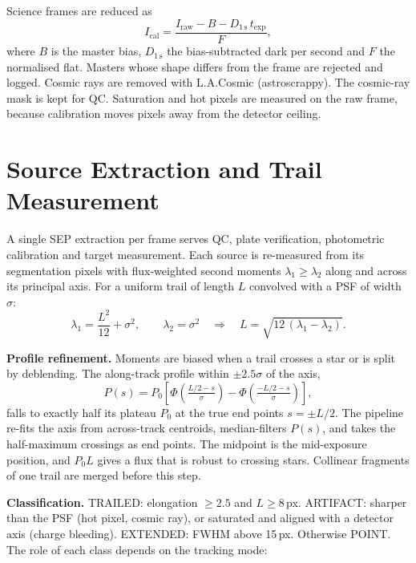 \documentclass[11pt,a4paper]{article}
\newcommand{\brkus}{\textunderscore\allowbreak}
\newcommand{\code}[1]{{\ttfamily\let\_\brkus #1}}
\begin{document}
Science frames are reduced as
\begin{equation}
I_\mathrm{cal} = \frac{I_\mathrm{raw} - B - D_{1\,\mathrm{s}}\, t_\mathrm{exp}}{F},
\end{equation}
where $B$ is the master bias, $D_{1\,\mathrm{s}}$ the bias-subtracted dark per second and $F$
the normalised flat. Masters whose shape differs from the frame are rejected and logged.
Cosmic rays are removed with L.A.Cosmic \cite{vandokkum2001} (astroscrappy). The
cosmic-ray mask is kept for QC. Saturation and hot pixels are measured on the raw frame,
because calibration moves pixels away from the detector ceiling.

\section{Source Extraction and Trail Measurement}

A single SEP \cite{bertin1996,barbary2016} extraction per frame serves QC, plate verification,
photometric calibration and target measurement. Each source is re-measured from its
segmentation pixels with flux-weighted second moments $\lambda_1 \geq \lambda_2$ along and
across its principal axis. For a uniform trail of length $L$ convolved with a PSF of width
$\sigma$:
\begin{equation}
\lambda_1 = \frac{L^2}{12} + \sigma^2,\qquad \lambda_2 = \sigma^2
\quad\Rightarrow\quad L = \sqrt{12\,(\lambda_1-\lambda_2)} .
\end{equation}

\textbf{Profile refinement.} Moments are biased when a trail crosses a star or is split by
deblending. The along-track profile within $\pm 2.5\sigma$ of the axis,
\begin{equation}
P(s) = P_0\left[\Phi\!\left(\tfrac{L/2 - s}{\sigma}\right) - \Phi\!\left(\tfrac{-L/2 - s}{\sigma}\right)\right],
\end{equation}
falls to exactly half its plateau $P_0$ at the true end points $s=\pm L/2$. The pipeline
re-fits the axis from across-track centroids, median-filters $P(s)$, and takes the
half-maximum crossings as end points. The midpoint is the mid-exposure position, and
$P_0 L$ gives a flux that is robust to crossing stars. Collinear fragments of one trail are
merged before this step.

\textbf{Classification.} \code{TRAILED}: elongation $\geq 2.5$ and $L\geq 8$\,px.
\code{ARTIFACT}: sharper than the PSF (hot pixel, cosmic ray), or saturated and aligned with a
detector axis (charge bleeding). \code{EXTENDED}: FWHM above 15\,px. Otherwise \code{POINT}.
The role of each class depends on the tracking mode:
\end{document}
